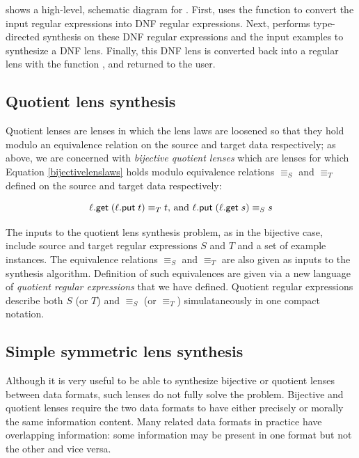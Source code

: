 \documentclass[12pt]{article}
\begin{document}
{ shows a high-level,
schematic diagram for \Optician{}.
First, \Optician{} uses the function \ToDNFRegex{} to convert the input
regular expressions into DNF regular expressions.  Next,
\SynthDNFLens{} performs type-directed synthesis on these DNF regular
expressions and the input examples to synthesize a DNF lens.  Finally, this DNF lens is
converted back into a regular lens with the function \ToLens{}, and returned to the user.


\subsection{Quotient lens synthesis}

Quotient lenses are lenses in which the lens laws are
loosened so that they hold modulo an equivalence relation on the source and
target data respectively; as above, we are concerned with {\em bijective
quotient lenses} which are lenses for which Equation \ref{bijectivelenslaws}
holds modulo equivalence relations $\equiv_S$ and $\equiv_T$ defined on the source
and target data respectively:

\begin{equation}\label{quotientlenslaws}
\ell.\mathsf{get} \; (\ell.\mathsf{put} \; t) \equiv_T t \text{, and } \ell.\mathsf{put} \; (\ell.\mathsf{get}
\; s) \equiv_S s
\end{equation}

The inputs to the quotient lens synthesis problem, as in the bijective case,
include source and target regular expressions $S$ and $T$ and a set of example
instances.  The equivalence relations $\equiv_S$ and $\equiv_T$ are also given
as inputs to the synthesis algorithm.  Definition of such equivalences
are given via a new language of \textit{quotient regular expressions}
that we have defined.  Quotient regular expressions
describe both  $S$ (or $T$) and $\equiv_S$ (or $\equiv_T$)
simulataneously in one compact notation.

\subsection{Simple symmetric lens synthesis}
Although it is very useful to be able to synthesize bijective or
quotient lenses between data formats, such lenses do not fully solve the
problem. 
Bijective and quotient lenses require the two data formats to have
either precisely or morally the same information content. 
Many related data formats in practice have overlapping
information: some information may be present in one format but not the
other and vice versa.  

}
\end{document}
